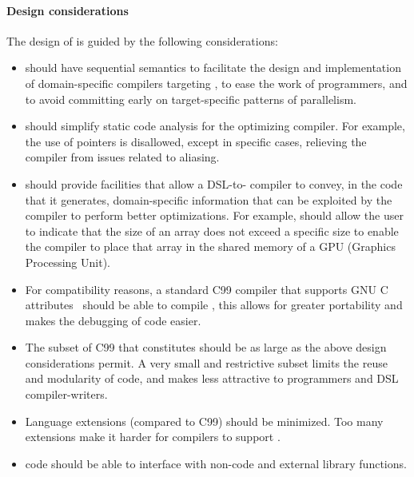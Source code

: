 \paragraph*{Design considerations}
The design of \pencil is guided by the following considerations:
\begin{itemize}
\item \pencil should have sequential semantics to facilitate the
  design and implementation of domain-specific compilers targeting
  \pencil, to ease the work of \pencil programmers, and to avoid committing
  early on target-specific patterns of parallelism.


\item \pencil should simplify static code analysis for the optimizing compiler.
  For example, the use of pointers is disallowed, except in specific cases,
  relieving the compiler from issues related to aliasing.

\item \pencil should provide facilities that allow a DSL-to-\pencil
  compiler to convey, in the \pencil code that it generates,
  domain-specific information that can be exploited by the
  compiler to perform better optimizations.  For example, \pencil
  should allow the user to indicate that the size of an array does not
  exceed a specific size to enable the compiler to place
  that array in the shared memory of a GPU (Graphics Processing Unit).

\item For compatibility reasons, a standard C99 compiler that supports
  GNU C attributes~\cite{gccguide} should be able to compile \pencil, this allows for
  greater portability and makes the debugging of \pencil code easier.

\item The subset of C99 that constitutes \pencil should
  be as large as the above design  considerations permit.
  A very small and restrictive subset limits the reuse and
  modularity of \pencil code, and makes
  \pencil less attractive to programmers and
  DSL compiler-writers.

\item Language extensions (compared to C99) should be minimized.
  Too many extensions make it harder for compilers
  to support \pencil.

\item \pencil code should be able to interface with non-\pencil code
  and external library functions.
\end{itemize}

